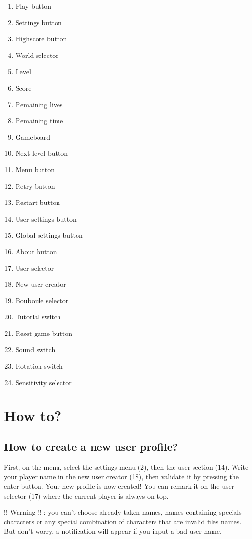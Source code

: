 \documentclass[a4paper,10pt]{report}
\begin{document}
\begin{multicols}{3}
\begin{enumerate}
\item Play button
\item Settings button
\item Highscore button
\item World selector
\item Level
\item Score
\item Remaining lives
\item Remaining time
\item Gameboard
\item Next level button
\item Menu button
\item Retry button
\item Restart button
\item User settings button
\item Global settings button
\item About button
\item User selector
\item New user creator
\item Bouboule selector
\item Tutorial switch
\item Reset game button
\item Sound switch
\item Rotation switch
\item Sensitivity selector
\end{enumerate}
\end{multicols}


\section*{How to?}

	\subsection*{How to create a new user profile?}
First, on the menu, select the settings menu (2), then the user section (14). Write your player name in the new user creator (18), then validate it by pressing the enter button. Your new profile is now created! You can remark it on the user selector (17) where the current player is always on top.

!! Warning !! : you can't choose already taken names, names containing specials characters or any special combination of characters that are invalid files names. But don't worry, a notification will appear if you input a bad user name.
\end{document}
